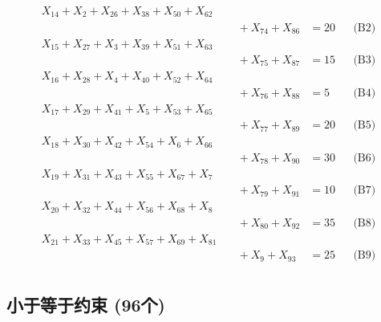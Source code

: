 \documentclass[a4paper,10pt]{article}
\begin{document}
{\begin{align}
X_{14} + X_{2} + X_{26} + X_{38} + X_{50} + X_{62} \\[0.5ex]
&\quad  + X_{74} + X_{86} &= 20 && \text{(B2)} \\
X_{15} + X_{27} + X_{3} + X_{39} + X_{51} + X_{63} \\[0.5ex]
&\quad  + X_{75} + X_{87} &= 15 && \text{(B3)} \\
X_{16} + X_{28} + X_{4} + X_{40} + X_{52} + X_{64} \\[0.5ex]
&\quad  + X_{76} + X_{88} &= 5 && \text{(B4)} \\
X_{17} + X_{29} + X_{41} + X_{5} + X_{53} + X_{65} \\[0.5ex]
&\quad  + X_{77} + X_{89} &= 20 && \text{(B5)} \\
X_{18} + X_{30} + X_{42} + X_{54} + X_{6} + X_{66} \\[0.5ex]
&\quad  + X_{78} + X_{90} &= 30 && \text{(B6)} \\
X_{19} + X_{31} + X_{43} + X_{55} + X_{67} + X_{7} \\[0.5ex]
&\quad  + X_{79} + X_{91} &= 10 && \text{(B7)} \\
X_{20} + X_{32} + X_{44} + X_{56} + X_{68} + X_{8} \\[0.5ex]
&\quad  + X_{80} + X_{92} &= 35 && \text{(B8)} \\
X_{21} + X_{33} + X_{45} + X_{57} + X_{69} + X_{81} \\[0.5ex]
&\quad  + X_{9} + X_{93} &= 25 && \text{(B9)} \\
\allowbreak
\end{align}}

\subsection{小于等于约束 (96个)}
\end{document}

